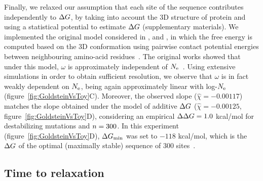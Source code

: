 \documentclass[authoryear]{elsarticle} %
\begin{document}
Finally, we relaxed our assumption that each site of the sequence contributes independently to $\Delta G$, by taking into account the 3D structure of protein and using a statistical potential to estimate $\Delta G$ (supplementary materials).
We implemented the original model considered in \citet{Williams2006}, \citet{Goldstein2011} and \citet{Pollock2012}, in which the free energy is computed based on the 3D conformation using pairwise contact potential energies between neighbouring amino-acid residues~\citep{Miyazawa1985}.
The original works showed that under this model, $\omega$ is approximately independent of $N_{\text{e}}$~\citep{Goldstein2013}.
Using extensive simulations in order to obtain sufficient resolution, we observe that $\omega$ is in fact weakly dependent on $N_{\text{e}}$, being again approximately linear with log-$N_{\text{e}}$ (figure~\ref{fig:GoldsteinVsToy}C).
Moreover, the observed slope ($\widehat{\chi}=-0.00117$) matches the slope obtained under the model of additive $\Delta G$ ($\widehat{\chi}=-0.00125$, figure~\ref{fig:GoldsteinVsToy}D), considering an empirical $\Delta \Delta G = 1.0$ kcal/mol for destabilizing mutations and $n=300$.
In this experiment (figure~\ref{fig:GoldsteinVsToy}D), $\Delta G_{\text{min}}$ was set to $-118$ kcal/mol, which is the $\Delta G$ of the optimal (maximally stable) sequence of $300$ sites~\citep{Goldstein2011}.

\subsection{Time to relaxation}
\end{document}

